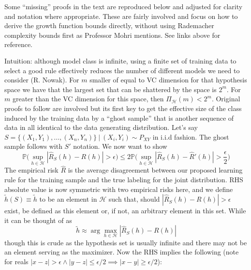 \begin{flushleft}
	Some ``missing'' proofs in the text are reproduced below and adjusted for
	clarity and notation where appropriate. These are fairly involved and focus on
	how to derive the growth function bounds directly, without using Rademacher
	complexity bounds first as Professor Mohri mentions. See links above for
	reference.

	Intuition: although model class is infinite, using a finite set of training
	data to select a good rule effectively reduces the number of different models
	we need to consider (R. Nowak). For $m$ smaller of equal to VC dimension for
	that hypothesis space we have that the largest set that can be shattered by the
	space is $2^m$. For $m$ greater than the VC dimension for this space, then
	$\Pi_{\mathcal{H}}(m) < 2^m$. Original proofs to follow are involved but its
	first key to get the effective size of the class induced by the training data
	by a ``ghost sample'' that is another sequence of data in all identical to the
	data generating distribution. Let's say $S = \{(X_1, Y_1), \ldots, (X_n,
		Y_n)\}~|~(X_i,Y_i) \sim P_{XY}$ in i.i.d fashion. The ghost sample follows with
	$S'$ notation. We now want to show $$\mathbb{P}\bigl(\sup_{h \in \mathcal{H}}
		|\hat{R}_S(h) - R(h)| > \epsilon\bigr) \leq 2\mathbb{P}\bigl(\sup_{h \in
			\mathcal{H}}|\hat{R}_S(h)-\hat{R}'(h)| > \frac{\epsilon}{2}\bigr)$$ The
	empirical risk $\hat{R}$ is the average disagreement between our proposed
	learning rule for the training sample and the true labeling for the joint
	distribution. RHS absolute value is now symmetric with two empirical risks
	here, and we define $\tilde{h}(S) \equiv \tilde{h}$ to be an element in
	$\mathcal{H}$ such that, should $|\hat{R}_S(h) - R(h)| > \epsilon$ exist, be
	defined as this element or, if not, an arbitrary element in this set. While it
	can be thought of as $$\tilde{h} \approx \arg \max_{h \in \mathcal{H}}
		|\hat{R}_S(h) - R(h)| $$ though this is crude as the hypothesis set is usually
	infinite and there may not be an element serving as the maximizer. Now the RHS
	implies the following (note for reals $|x-z| > \epsilon \wedge |y-z| \leq
		\epsilon/2 \implies |x-y| \geq \epsilon/2$):


\end{flushleft}
